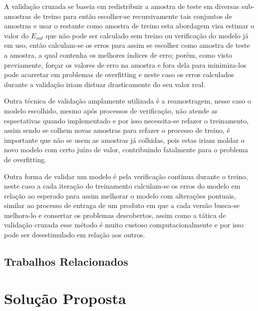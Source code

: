 \documentclass[pfc]{imetex}
\begin{document}
    A validação cruzada se baseia em redistribuir a amostra de teste em diversas sub-amostras de treino para então escolher-se recursivamente tais conjuntos de amostras e usar o restante como amostra de treino esta abordagem visa estimar o valor do $E_{out}$ que não pode ser calculado sem treino ou verificação do modelo já em uso, então calculam-se os erros para assim se escolher como amostra de teste a amostra, a qual contenha os melhores índices de erro; porém, como visto previamente, forçar os valores de erro na amostra e fora dela para minimiza-los pode acarretar em problemas de overfitting e neste caso os erros calculados durante a validação iriam distuar drasticamente do seu valor real.

    Outra técnica de validação amplamente utilizada é a reamostragem, nesse caso o modelo escolhido, mesmo após processos de verificação, não atende as espectativas quando implementado e por isso necessita-se refazer o treinamento, assim sendo se colhem novas amostras para refazer o processo de treino, é importante que não se usem as amostras já colhidas, pois estas iriam moldar o novo modelo com certo juízo de valor, contribuindo fatalmente para o problema de overfitting.

    Outra forma de validar um modelo é pela verificação continua durante o treino, neste caso a cada iteração do treinamento calculam-se os erros  do modelo em relação ao esperado para assim melhorar o modelo com alterações pontuais, similar ao processo de entraga de um produto em que a cada versão busca-se melhora-lo e consertar os problemas descobertos, assim como a tática de validação cruzada esse método é muito custoso computacionalmente e por isso pode ser desestimulado em relação aos outros.
    
\label{fundamentaca}


\section{Trabalhos Relacionados}

\label{relacionados}


\chapter{Solução Proposta}
\label{solucao}


\begin{center}
    \noindent{}
\end{center}
\end{document}
